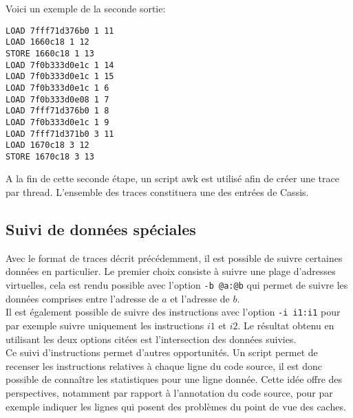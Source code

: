 Voici un exemple de la seconde sortie: \\
\begin{framed}
\begin{verbatim}
LOAD 7fff71d376b0 1 11
LOAD 1660c18 1 12
STORE 1660c18 1 13
LOAD 7f0b333d0e1c 1 14
LOAD 7f0b333d0e1c 1 15
LOAD 7f0b333d0e1c 1 6
LOAD 7f0b333d0e08 1 7
LOAD 7fff71d376b0 1 8
LOAD 7f0b333d0e1c 1 9
LOAD 7fff71d371b0 3 11
LOAD 1670c18 3 12
STORE 1670c18 3 13
\end{verbatim}
\end{framed}

A la fin de cette seconde étape, un script \textsf{awk} est utilisé afin de créer une trace par thread. L'ensemble des traces constituera une des entrées de \textsf{Cassis}.

\subsection{Suivi de données spéciales}
Avec le format de traces décrit précédemment, il est possible de suivre certaines données en particulier. Le premier choix consiste à suivre une plage d'adresses virtuelles, cela est rendu possible avec l'option \texttt{-b @a:@b} qui permet de suivre les données comprises entre l'adresse de $a$ et l'adresse de $b$. \\

Il est également possible de suivre des instructions avec l'option \texttt{-i i1:i1} pour par exemple suivre uniquement les instructions $i1$ et $i2$. Le résultat obtenu en utilisant les deux options citées est l'intersection des données suivies. \\

Ce suivi d'instructions permet d'autres opportunités. Un script permet de recenser les instructions relatives à chaque ligne du code source, il est donc possible de connaître les statistiques pour une ligne donnée. Cette idée offre des perspectives, notamment par rapport à l'annotation du code source, pour par exemple indiquer les lignes qui posent des problèmes du point de vue des caches.

